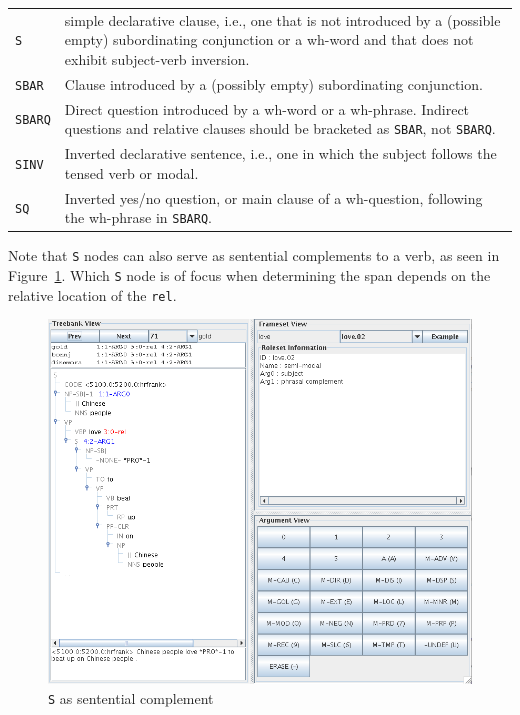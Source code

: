 \documentclass[11pt]{report}
\begin{document}
\begin{tabular}{lp{13.09cm}}
	\texttt{S} & simple declarative clause, i.e., one that is not introduced by a (possible empty) subordinating conjunction or a wh-word and that does not exhibit subject-verb inversion.\\
	\texttt{SBAR} & Clause introduced by a (possibly empty) subordinating conjunction.\\
	\texttt{SBARQ} & Direct question introduced by a wh-word or a wh-phrase. Indirect questions and relative clauses should be bracketed as \texttt{SBAR}, not \texttt{SBARQ}.\\
	\texttt{SINV} & Inverted declarative sentence, i.e., one in which the subject follows the tensed verb or modal.\\
	\texttt{SQ} & Inverted yes/no question, or main clause of a wh-question, following the wh-phrase in \texttt{SBARQ}.
\end{tabular}

Note that \texttt{S} nodes can also serve as sentential complements to a verb, as seen in Figure~\ref{fig: SComplement}.  Which \texttt{S} node is of focus when determining the span depends on the relative location of the \texttt{rel}.  

\begin{figure}[htbp]
\centering
\includegraphics[scale=0.4]{img/SComplement.png}
\caption{\texttt{S} as sentential complement}
\label{fig: SComplement}
\end{figure}
\end{document}
